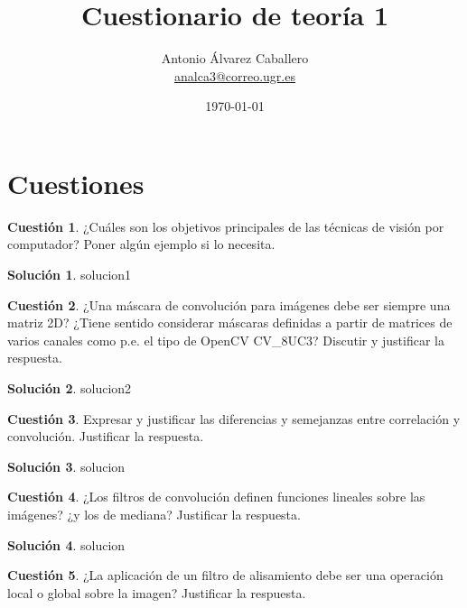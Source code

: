 \documentclass[a4paper, 11pt]{article}
\title{Cuestionario de teoría 1 }
\author{Antonio Álvarez Caballero\\
    \href{mailto:analca3@correo.ugr.es}{analca3@correo.ugr.es}}
\date{\today}
\theoremstyle{definition}
\newtheorem{cuestion}{Cuestión}
\newtheorem*{solucion}{Solución}
\begin{document}
  \maketitle

  \section{Cuestiones}

  \begin{cuestion}
      ¿Cuáles son los objetivos principales de las técnicas de visión por computador? Poner algún ejemplo si lo necesita.
  \end{cuestion}

  \begin{solucion}
    solucion1
  \end{solucion}

  \begin{cuestion}
      ¿Una máscara de convolución para imágenes debe ser siempre una matriz 2D? ¿Tiene sentido considerar máscaras definidas a partir de matrices de varios canales como p.e. el tipo de OpenCV CV\_8UC3? Discutir y justificar la respuesta.
  \end{cuestion}

  \begin{solucion}
      solucion2
  \end{solucion}

  \begin{cuestion}
      Expresar y justificar las diferencias y semejanzas entre correlación
      y convolución. Justificar la respuesta.
  \end{cuestion}

  \begin{solucion}
      solucion
  \end{solucion}

  \begin{cuestion}
      ¿Los filtros de convolución definen funciones lineales sobre las
      imágenes? ¿y los de mediana? Justificar la respuesta.
  \end{cuestion}

  \begin{solucion}
      solucion
  \end{solucion}

  \begin{cuestion}
      ¿La aplicación de un filtro de alisamiento debe ser una operación
      local o global sobre la imagen? Justificar la respuesta.
  \end{cuestion}
\end{document}
